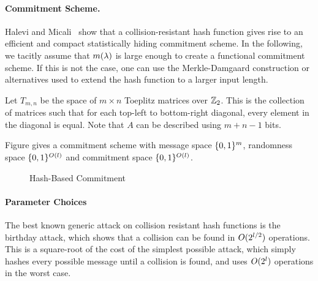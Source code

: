 \paragraph{Commitment Scheme.} Halevi and Micali~\cite{HalMic96} show that a collision-resistant hash function gives rise to an efficient and compact statistically hiding commitment scheme. In the following, we tacitly assume that $m(\lambda)$ is large enough to create a functional commitment scheme. If this is not the case, one can use the Merkle-Damgaard construction or alternatives \cite{Lucks04,NandiP10} used to extend the hash function to a larger input length.

Let $T_{m,n}$ be the space of $m \times n$ Toeplitz matrices over $\mathbb{Z}_2$. This is the collection of matrices such that for each top-left to bottom-right diagonal, every element in the diagonal is equal. Note that $A$ can be described using $m+n-1$ bits.

Figure \label{alg:com:hash} gives a commitment scheme with message space $\{0,1\}^{m}$, randomness space $\{0,1\}^{O(l)}$ and commitment space $\{0,1\}^{O(l)}$.

\begin{figure}[t]
  \caption{Hash-Based Commitment}
\label{alg:com:hash}
\end{figure}

\paragraph{Parameter Choices}

The best known generic attack on collision resistant hash functions is the birthday attack, which shows that a collision can be found in $O(2^{l / 2})$ operations. This is a square-root of the cost of the simplest possible attack, which simply hashes every possible message until a collision is found, and uses $O(2^{l})$ operations in the worst case.